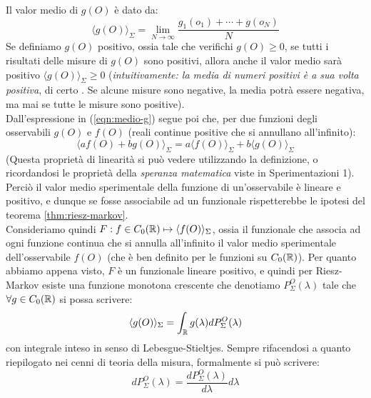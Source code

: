 \documentclass[FisicaTeorica.tex]{subfiles}
\begin{document}
Il valor medio di $g(O)$ è dato da:
\begin{equation}
\langle g (O)\rangle_\Sigma = \lim_{N\to\infty} \frac{g_1(o_1) + \cdots + g(o_N)}{N}
    \label{eqn:medio-g}
\end{equation}
Se definiamo $g(O)$ positivo, ossia tale che verifichi $g(O) \geq 0$, se tutti i risultati delle misure di $g(O)$ sono positivi, allora anche il valor medio sarà positivo $\langle g(O)\rangle_\Sigma \geq 0$ (\textit{intuitivamente: la media di numeri positivi è a sua volta positiva}, di certo . Se alcune misure sono negative, la media potrà essere negativa, ma mai se tutte le misure sono positive).\\
Dall'espressione in (\ref{eqn:medio-g}) segue poi che, per due funzioni degli osservabili $g(O)$ e $f(O)$ (reali continue positive che si annullano all'infinito):
\[
\langle a f(O)+bg(O)\rangle_\Sigma = a\langle f(O)\rangle_\Sigma + b\langle g(O)\rangle_\Sigma
\]
(Questa proprietà di linearità si può vedere utilizzando la definizione, o ricordandosi le proprietà della \textit{speranza matematica} viste in Sperimentazioni 1).\\
Perciò il valor medio sperimentale della funzione di un'osservabile è lineare e positivo, e dunque se fosse associabile ad un funzionale  rispetterebbe le ipotesi del teorema \ref{thm:riesz-markov}. \\
Consideriamo quindi $F: f\in C_0(\mathbb{R})\mapsto \langle f(O)\rangle_\Sigma$, ossia il funzionale che associa ad ogni funzione continua che si annulla all'infinito il valor medio sperimentale dell'osservabile $f(O)$ (che è ben definito per le funzioni su $C_0(\mathbb{R})$). Per quanto abbiamo appena visto, $F$ è un funzionale lineare positivo, e quindi per Riesz-Markov esiste una funzione monotona crescente che denotiamo $P_\Sigma^O(\lambda)$ tale che $\forall g \in C_0(\mathbb{R})$ si possa scrivere: 
\begin{equation}
\langle g(O)\rangle_\Sigma = \int_{\mathbb{R}} g(\lambda) dP_\Sigma^O(\lambda)
    \label{eqn:valor-medio-riesz}
\end{equation}
con integrale inteso in senso di Lebesgue-Stieltjes. Sempre rifacendosi a quanto riepilogato nei cenni di teoria della misura, formalmente si può scrivere:
\begin{equation}
dP_\Sigma^O\left(\lambda\right)=\frac{dP_\Sigma^O\left(\lambda\right)}{d\lambda}d\lambda 
\label{eqn:psigma-change}
\end{equation}
\end{document}
